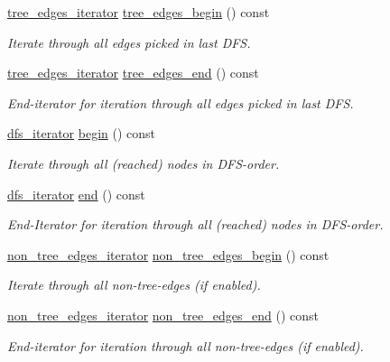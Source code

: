 \begin{DoxyCompactItemize}
\mbox{\hyperlink{classdfs_accde8d5403404f6d22fe4756d4ffedd5}{tree\+\_\+edges\+\_\+iterator}} \mbox{\hyperlink{classdfs_afe193938a05b114870c19163731273c8}{tree\+\_\+edges\+\_\+begin}} () const
\begin{DoxyCompactList}\small\item\em Iterate through all edges picked in last D\+FS. \end{DoxyCompactList}\item 
\mbox{\hyperlink{classdfs_accde8d5403404f6d22fe4756d4ffedd5}{tree\+\_\+edges\+\_\+iterator}} \mbox{\hyperlink{classdfs_ad1b9f759569cb52ba7ee415862c79831}{tree\+\_\+edges\+\_\+end}} () const
\begin{DoxyCompactList}\small\item\em End-\/iterator for iteration through all edges picked in last D\+FS. \end{DoxyCompactList}\item 
\mbox{\hyperlink{classdfs_a15fe023a5a1f7ddda00f3d87110d9a32}{dfs\+\_\+iterator}} \mbox{\hyperlink{classdfs_ab06650dd8cbd5e76b0c73b71458ec5ec}{begin}} () const
\begin{DoxyCompactList}\small\item\em Iterate through all (reached) nodes in D\+F\+S-\/order. \end{DoxyCompactList}\item 
\mbox{\hyperlink{classdfs_a15fe023a5a1f7ddda00f3d87110d9a32}{dfs\+\_\+iterator}} \mbox{\hyperlink{classdfs_af847633fa642258d3522e8deb26aef37}{end}} () const
\begin{DoxyCompactList}\small\item\em End-\/\+Iterator for iteration through all (reached) nodes in D\+F\+S-\/order. \end{DoxyCompactList}\item 
\mbox{\hyperlink{classdfs_a95e353f354d3b31daded0c4fe749171a}{non\+\_\+tree\+\_\+edges\+\_\+iterator}} \mbox{\hyperlink{classdfs_a4efe5bb72d00305e6b226e67c2b2ef6e}{non\+\_\+tree\+\_\+edges\+\_\+begin}} () const
\begin{DoxyCompactList}\small\item\em Iterate through all non-\/tree-\/edges (if enabled). \end{DoxyCompactList}\item 
\mbox{\hyperlink{classdfs_a95e353f354d3b31daded0c4fe749171a}{non\+\_\+tree\+\_\+edges\+\_\+iterator}} \mbox{\hyperlink{classdfs_ad9cd92a18bda23edca8ab3ac60a15ef4}{non\+\_\+tree\+\_\+edges\+\_\+end}} () const
\begin{DoxyCompactList}\small\item\em End-\/iterator for iteration through all non-\/tree-\/edges (if enabled). \end{DoxyCompactList}\item 

\end{DoxyCompactItemize}
